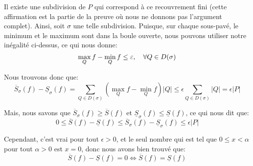 \documentclass[a4paper]{article}
\begin{document}
{{        Il existe une subdivision de $P$ qui correspond à ce recouvrement fini (cette affirmation est la partie de la preuve où nous ne donnons pas l'argument complet). Ainsi, soit $\sigma$ une telle subdivision. Puisque, sur chaque sous-pavé, le minimum et le maximum sont dans la boule ouverte, nous pouvons utiliser notre inégalité ci-dessus, ce qui nous donne: 
        \[\max_{Q} f - \min_{Q} f \leq \epsilon, \mathspace \forall Q \in D\left(\sigma\right)\]
        
        Nous trouvons donc que: 
        \[\overline{S}_{\sigma}\left(f\right) - \underline{S}_{\sigma}\left(f\right) = \sum_{Q \in D\left(\sigma\right)}^{} \left(\max_{Q} f - \min_{Q} f\right) \left|Q\right| \leq \epsilon \sum_{Q \in D\left(\sigma\right)}^{} \left|Q\right| = \epsilon \left|P\right|\]

        Mais, nous savons que $\overline{S}_{\sigma}\left(f\right) \geq \overline{S}\left(f\right)$ et $\underline{S}_{\sigma}\left(f\right) \leq \underline{S}\left(f\right)$, ce qui nous dit que: 
        \[0 \leq \overline{S}\left(f\right) - \underline{S}\left(f\right) \leq \overline{S}_{\sigma}\left(f\right) - \underline{S}_{\sigma}\left(f\right) \leq \epsilon \left|P\right|\]
        
        Cependant, c'est vrai pour tout $\epsilon > 0$, et le seul nombre qui est tel que $0 \leq x < \alpha$ pour tout $\alpha > 0$ est $x = 0$, donc nous avons bien trouvé que: 
        \[\overline{S}\left(f\right) - \underline{S}\left(f\right) = 0 \iff \overline{S}\left(f\right) = \underline{S}\left(f\right)\]
    }
}
\end{document}
